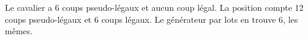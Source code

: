 Le cavalier a 6 coups pseudo-légaux et aucun coup légal. La position compte 12 coups pseudo-légaux et 6 coups légaux. Le générateur par lots en trouve 6, les mêmes.
